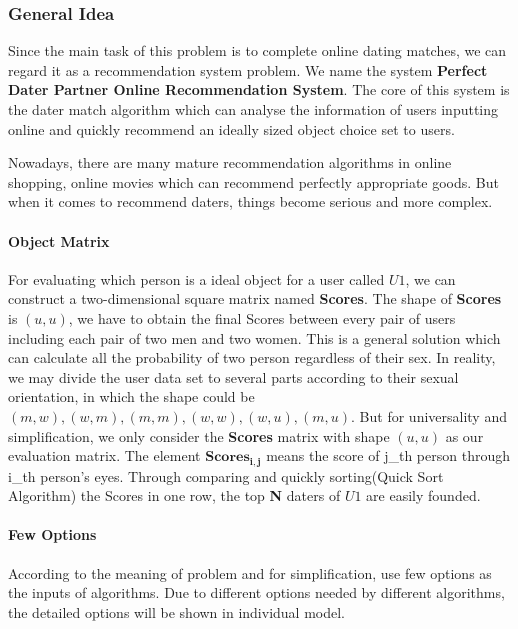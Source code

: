 \subsubsection{General Idea}                              

Since the main task of this problem is to complete online dating matches, we can regard it as a recommendation system problem. We name the system \textbf{Perfect Dater Partner Online Recommendation System}. The core of this system is the dater match algorithm which can analyse the information of users inputting online and quickly recommend an ideally sized object choice set to users. \par
Nowadays, there are many mature recommendation algorithms in online shopping, online movies which can recommend perfectly appropriate goods. But when it comes to recommend daters, things become serious and more complex. 
\indent
\paragraph{Object Matrix}
For evaluating which person is a ideal object for a user called $U1$, we can construct a two-dimensional square matrix named \textbf{Scores}. The shape of \textbf{Scores} is $(u,u)$, we have to obtain the final Scores between every pair of users including each pair of two men and two women. This is a general solution which can calculate all the probability of two person regardless of their sex. In reality, we may divide the user data set to several parts according to their sexual orientation, in which the shape could be $(m,w), (w,m), (m,m), (w,w), (w,u), (m,u)$. But for universality and simplification, we only consider the \textbf{Scores} matrix with shape $(u,u)$ as our evaluation matrix. The element $\mathbf{Scores_{i,j}}$ means the score of j\_th person through i\_th person's eyes. Through comparing and quickly sorting(Quick Sort Algorithm) the Scores in one row, the top \textbf{N} daters of $U1$ are easily founded. 

\paragraph{Few Options}
According to the meaning of problem and for simplification, use few options as the inputs of algorithms. Due to different options needed by different algorithms, the detailed options will be shown in individual model.

